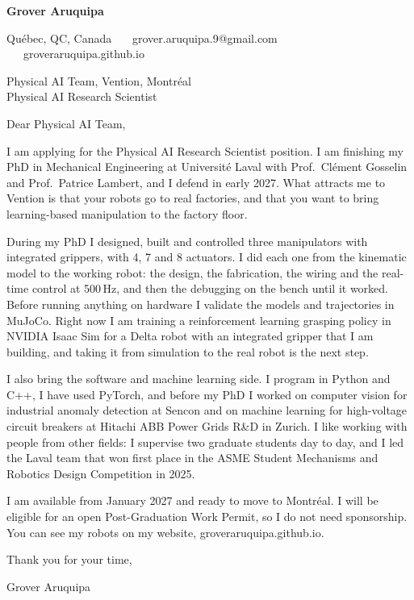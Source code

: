 \documentclass[11pt,letterpaper]{article}
\begin{document}
{\large\bfseries Grover Aruquipa}\par\vspace{-6pt}
{\small Qu\'ebec, QC, Canada \ \textbullet\ \ grover.aruquipa.9@gmail.com \ \textbullet\ \ groveraruquipa.github.io}

\vspace{4pt}
Physical AI Team, Vention, Montr\'eal\\
Physical AI Research Scientist

Dear Physical AI Team,

I am applying for the Physical AI Research Scientist position. I am finishing my PhD in Mechanical Engineering at Universit\'e Laval with Prof.\ Cl\'ement Gosselin and Prof.\ Patrice Lambert, and I defend in early 2027. What attracts me to Vention is that your robots go to real factories, and that you want to bring learning-based manipulation to the factory floor.

During my PhD I designed, built and controlled three manipulators with integrated grippers, with 4, 7 and 8 actuators. I did each one from the kinematic model to the working robot: the design, the fabrication, the wiring and the real-time control at 500\,Hz, and then the debugging on the bench until it worked. Before running anything on hardware I validate the models and trajectories in MuJoCo. Right now I am training a reinforcement learning grasping policy in NVIDIA Isaac Sim for a Delta robot with an integrated gripper that I am building, and taking it from simulation to the real robot is the next step.

I also bring the software and machine learning side. I program in Python and C++, I have used PyTorch, and before my PhD I worked on computer vision for industrial anomaly detection at Sencon and on machine learning for high-voltage circuit breakers at Hitachi ABB Power Grids R\&D in Zurich. I like working with people from other fields: I supervise two graduate students day to day, and I led the Laval team that won first place in the ASME Student Mechanisms and Robotics Design Competition in 2025.

I am available from January 2027 and ready to move to Montr\'eal. I will be eligible for an open Post-Graduation Work Permit, so I do not need sponsorship. You can see my robots on my website, groveraruquipa.github.io.

Thank you for your time,

Grover Aruquipa
\end{document}

